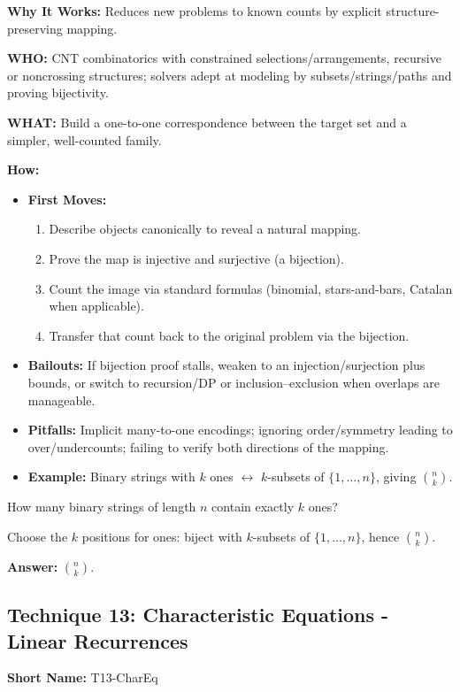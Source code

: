 \documentclass[12pt]{article}
\newenvironment{problem}[1]
{\begin{tcolorbox}[colback=blue!5!white,colframe=blue!75!black,title={#1}]}{\end{tcolorbox}}
\newenvironment{solution}
{\begin{tcolorbox}[colback=green!5!white,colframe=green!75!black,title={Solution}]}{\end{tcolorbox}}
\begin{document}
\textbf{Why It Works:} Reduces new problems to known counts by explicit structure-preserving mapping.

\textbf{WHO:} CNT combinatorics with constrained selections/arrangements, recursive or noncrossing structures; solvers adept at modeling by subsets/strings/paths and proving bijectivity.

\textbf{WHAT:} Build a one-to-one correspondence between the target set and a simpler, well-counted family.


\textbf{How:}
\begin{itemize}
    \item \textbf{First Moves:}
    \begin{enumerate}[nosep]
        \item Describe objects canonically to reveal a natural mapping.
        \item Prove the map is injective and surjective (a bijection).
        \item Count the image via standard formulas (binomial, stars-and-bars, Catalan when applicable).
        \item Transfer that count back to the original problem via the bijection.
    \end{enumerate}
    \item \textbf{Bailouts:} If bijection proof stalls, weaken to an injection/surjection plus bounds, or switch to recursion/DP or inclusion--exclusion when overlaps are manageable.
    \item \textbf{Pitfalls:} Implicit many-to-one encodings; ignoring order/symmetry leading to over/undercounts; failing to verify both directions of the mapping.
    \item \textbf{Example:} Binary strings with $k$ ones $\leftrightarrow$ $k$-subsets of $\{1,\dots,n\}$, giving $\binom{n}{k}$.
\end{itemize}

\begin{problem}{Example: Binary Strings with $k$ Ones}
How many binary strings of length $n$ contain exactly $k$ ones?
\end{problem}

\begin{solution}
Choose the $k$ positions for ones: biject with $k$-subsets of $\{1,\dots,n\}$, hence $\binom{n}{k}$.

\textbf{Answer:} $\binom{n}{k}$.
\end{solution}

\subsection{Technique 13: Characteristic Equations - Linear Recurrences}
\textbf{Short Name:} T13-CharEq
\end{document}

